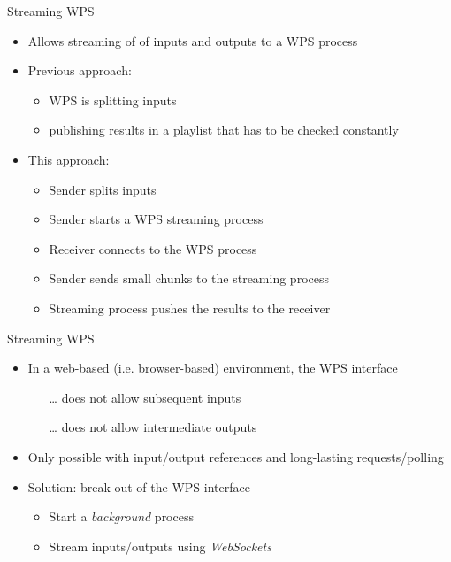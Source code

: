 \documentclass[xcolor=svgnames,professionalfonts,11pt,aspectratio=43,handout]{beamer}
\begin{document}

\begin{frame}[t]{Streaming WPS}
  \begin{itemize}
    \item Allows streaming of of inputs and outputs to a WPS process
    \pause
    \item Previous approach:
    \begin{itemize}
      \item WPS is splitting inputs
      \item publishing results in a playlist that has to be checked constantly
    \end{itemize}
    \pause
    \item This approach:
    \begin{itemize}
      \item Sender splits inputs
      \item Sender starts a WPS streaming process
      \item Receiver connects to the WPS process
      \item Sender sends small chunks to the streaming process
      \item Streaming process pushes the results to the receiver
    \end{itemize}
  \end{itemize}
\end{frame}

\begin{frame}[t]{Streaming WPS}
  \begin{itemize}
    \item In a web-based (i.e. browser-based) environment, the WPS interface
    \begin{itemize}
      \item[\dots] does not allow subsequent inputs
      \item[\dots] does not allow intermediate outputs
    \end{itemize}
    \item Only possible with input/output references and long-lasting requests/polling
    \pause
    \item Solution: break out of the WPS interface
    \begin{itemize}
      \item Start a \emph{background} process
      \item Stream inputs/outputs using \emph{WebSockets}
    \end{itemize}
  \end{itemize}
\end{frame}
\end{document}
